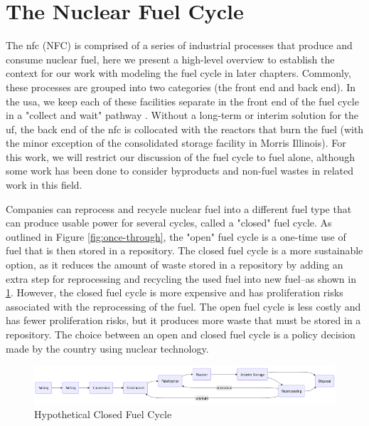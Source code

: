 \section{The Nuclear Fuel Cycle}
\label{sec:nfc}

The \acrlong{nfc} (NFC) is comprised of a series of industrial processes that
produce and consume nuclear fuel, here we present a high-level overview to
establish the context for our work with modeling the fuel cycle in later chapters. Commonly, these processes are grouped into two categories (the front
end and back end). In the \gls{usa}, we keep each of these facilities separate
in the front end of the fuel cycle in a "collect and wait" pathway
\cite{cycle_risks}. Without a long-term or interim solution for the \gls{uf},
the back end of the \gls{nfc} is collocated with the reactors that burn the
fuel (with the minor exception of the consolidated storage facility in Morris
Illinois). For this work, we will restrict our discussion of the fuel cycle to
fuel alone, although some work has been done to consider byproducts and
non-fuel wastes in related work in this field.

Companies can reprocess and recycle nuclear fuel into a different fuel type
that can produce usable power for several cycles, called a "closed" fuel cycle.
As outlined in Figure \ref{fig:once-through}, the "open" fuel cycle is a
one-time use of fuel that is then stored in a repository. The closed fuel cycle
is a more sustainable option, as it reduces the amount of waste stored in a
repository by adding an extra step for reprocessing and recycling the used fuel
into new fuel--as shown in \ref{fig:closed_fc}. However, the closed fuel cycle
is more expensive and has proliferation risks associated with the reprocessing
of the fuel. The open fuel cycle is less costly and has fewer proliferation
risks, but it produces more waste that must be stored in a repository. The
choice between an open and closed fuel cycle is a policy decision made by the
country using nuclear technology.

\begin{figure}[!ht]
      \centering
      \includegraphics[scale=0.55]{images/nfc/closed_fc.png}
      \caption{Hypothetical Closed Fuel Cycle}
      \label{fig:closed_fc}
\end{figure}

